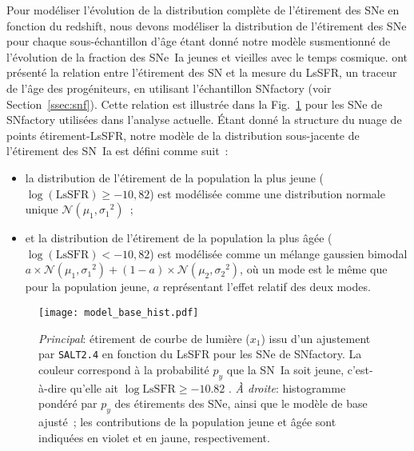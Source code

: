 \documentclass[../main/main.tex]{subfiles}
\begin{document}
Pour modéliser l'évolution de la distribution complète de l'étirement des SNe en
fonction du redshift, nous devons modéliser la distribution de l'étirement des
SNe pour chaque sous-échantillon d'âge étant donné notre modèle susmentionné de
l'évolution de la fraction des SNe~Ia jeunes et vieilles avec le temps cosmique.
\cite{rigault2020} ont présenté la relation entre l'étirement des SN et la
mesure du LsSFR, un traceur de l'âge des progéniteurs, en utilisant
l'échantillon SNfactory (voir Section~\ref{ssec:snf}). Cette relation est
illustrée dans la Fig.~\ref{fig:stretchlssfr} pour les SNe de SNfactory
utilisées dans l'analyse actuelle. Étant donné la structure du nuage de points
étirement-LsSFR, notre modèle de la distribution sous-jacente de l'étirement des
SN~Ia est défini comme suit~:
\begin{itemize}
    \item la distribution de l'étirement de la population la plus jeune
        ($\log(\mathrm{LsSFR})\geq-10,82$) est modélisée comme une distribution
        normale unique $\mathcal{N}(\mu_1, \sigma_1{}^2)$~;
    \item et la distribution de l'étirement de la population la plus âgée
        ($\log(\mathrm{LsSFR})<-10,82$) est modélisée comme un mélange gaussien
        bimodal $a\times \mathcal{N} (\mu_1, \sigma_1{}^2) + (1-a)\times
        \mathcal{N}(\mu_2, \sigma_2{}^2)$, où un mode est le même que pour la
        population jeune, $a$ représentant l'effet relatif des deux modes.
\end{itemize}

\begin{figure}
    \centering
    \texttt{[image: model\_base\_hist.pdf]}
    \caption[Étirement en fonction du LsSFR des SNe~Ia de SNfactory et modèles
    d'étirement de base ajustés]{\textit{Principal}: étirement de courbe de
        lumière ($x_1$) issu d'un ajustement par \textsc{\texttt{SALT2.4}} en
        fonction du LsSFR pour les SNe de SNfactory. La couleur correspond à la
        probabilité $p_y$ que la SN~Ia soit jeune, c'est-à-dire qu'elle ait
        $\log\mathrm{LsSFR} \geq -10.82$ \citep[voir][]{rigault2020}. \textit{À
        droite}: histogramme pondéré par $p_y$ des étirements des SNe, ainsi que
        le modèle de base ajusté~; les contributions de la population jeune
    et âgée sont indiquées en violet et en jaune, respectivement.}
    \label{fig:stretchlssfr}
\end{figure}
\end{document}
